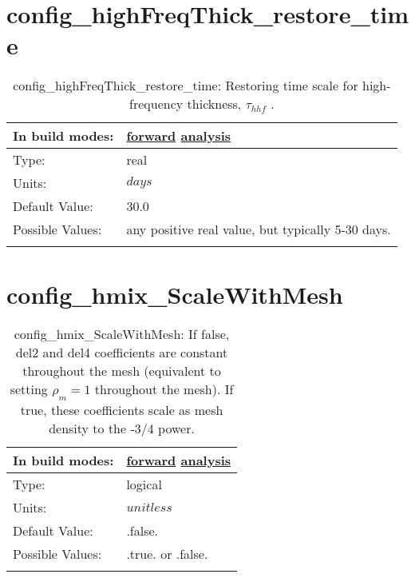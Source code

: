 \section[config\_highFreqThick\_restore\_time]{config\_highFreqThick\_restore\_time}
\label{sec:nm_sec_config_highFreqThick_restore_time}
\begin{center}
\begin{longtable}{| p{2.0in} || p{4.0in} |}
    \hline
    In build modes: & \hyperref[subsec:forward_nm_tab_ALE_frequency_filtered_thickness]{forward} \hyperref[subsec:analysis_nm_tab_ALE_frequency_filtered_thickness]{analysis} \\
    \hline
    Type: & real \\
    \hline
    Units: & $days$ \\
    \hline
    Default Value: & 30.0 \\
    \hline
    Possible Values: & any positive real value, but typically 5-30 days. \\
    \hline
    \caption{config\_highFreqThick\_restore\_time:  Restoring time scale for high-frequency thickness,  $\tau_{hhf}$ .}
\end{longtable}
\end{center}
\section[config\_hmix\_ScaleWithMesh]{config\_hmix\_ScaleWithMesh}
\label{sec:nm_sec_config_hmix_ScaleWithMesh}
\begin{center}
\begin{longtable}{| p{2.0in} || p{4.0in} |}
    \hline
    In build modes: & \hyperref[subsec:forward_nm_tab_hmix]{forward} \hyperref[subsec:analysis_nm_tab_hmix]{analysis} \\
    \hline
    Type: & logical \\
    \hline
    Units: & $unitless$ \\
    \hline
    Default Value: & .false. \\
    \hline
    Possible Values: & .true. or .false. \\
    \hline
    \caption{config\_hmix\_ScaleWithMesh:  If false, del2 and del4 coefficients are constant throughout the mesh (equivalent to setting  $\rho_m=1$  throughout the mesh).  If true, these coefficients scale as mesh density to the -3/4 power.}
\end{longtable}
\end{center}
